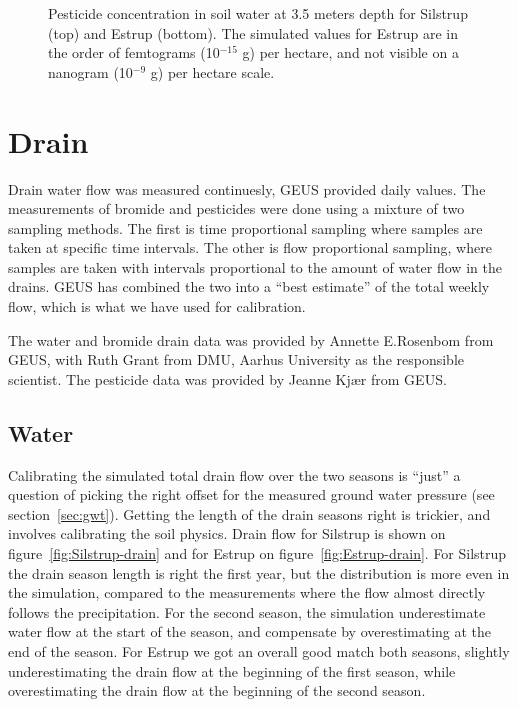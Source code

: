 \begin{figure}[htbp]
  \begin{center}
  \end{center}
  \caption{Pesticide concentration in soil water at 3.5 meters depth
    for Silstrup (top) and Estrup (bottom).  The simulated values for
    Estrup are in the order of femtograms (10$^{-15}$ g) per hectare,
    and not visible on a nanogram (10$^{-9}$ g) per hectare scale.}
  \label{fig:pest-horizontal}
\end{figure}

\FloatBarrier
\section{Drain}

Drain water flow was measured continuesly, GEUS provided daily values.
The measurements of bromide and pesticides were done using a mixture
of two sampling methods.  The first is time proportional sampling
where samples are taken at specific time intervals.  The other is flow
proportional sampling, where samples are taken with intervals
proportional to the amount of water flow in the drains.  GEUS has
combined the two into a ``best estimate'' of the total weekly flow,
which is what we have used for calibration.

The water and bromide drain data was provided by Annette E.\@ Rosenbom
from GEUS, with Ruth Grant from DMU, Aarhus University as the
responsible scientist.  The pesticide data was provided by Jeanne
Kj{\ae}r from GEUS.

\subsection{Water}

Calibrating the simulated total drain flow over the two seasons is
``just'' a question of picking the right offset for the measured
ground water pressure (see section~\ref{sec:gwt}).  Getting the length
of the drain seasons right is trickier, and involves calibrating the
soil physics.  Drain flow for Silstrup is shown on
figure~\ref{fig:Silstrup-drain} and for Estrup on
figure~\ref{fig:Estrup-drain}.  For Silstrup the drain season length
is right the first year, but the distribution is more even in the
simulation, compared to the measurements where the flow almost
directly follows the precipitation.  For the second season, the
simulation underestimate water flow at the start of the season, and
compensate by overestimating at the end of the season.  For Estrup we
got an overall good match both seasons, slightly underestimating the
drain flow at the beginning of the first season, while overestimating
the drain flow at the beginning of the second season.

